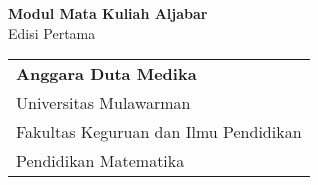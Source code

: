 
\thispagestyle{empty}

\vspace*{\fill}

{
	\centering
	
	{\Huge{\textbf{Modul Mata Kuliah Aljabar}}} \\[4pt]
	{\LARGE{Edisi Pertama}}
	
	\vspace{3cm}
	
	\begin{center}
		\begin{tabular}{l}
			{\huge{\textbf{Anggara Duta Medika}}} \\[4pt]
			{\large{Universitas Mulawarman}} \\
			{\large{Fakultas Keguruan dan Ilmu Pendidikan}} \\
			{\large{Pendidikan Matematika}}
		\end{tabular}
	\end{center}
}

\vspace*{\fill}

\newpage

\thispagestyle{empty}

\vspace*{\fill}%

